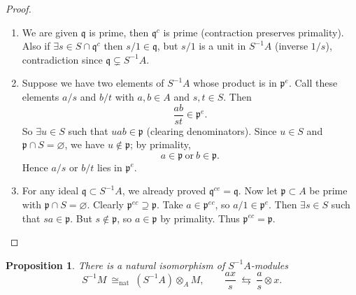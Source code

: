 \documentclass[11pt,a4paper]{article}
\theoremstyle{definition}
\theoremstyle{plain}
\newtheorem{proposition}[definition]{Proposition}
\theoremstyle{remark}
\begin{document}
\begin{proof}
    \begin{enumerate}
        \item We are given $\mathfrak{q}$ is prime, then $\mathfrak{q}^c$ is prime (contraction preserves primality).
        Also if $\exists s \in S \cap \mathfrak{q}^c$ then $s/1 \in \mathfrak{q}$, but $s/1$ is a unit in $S^{-1}A$ (inverse $1/s$), contradiction since $\mathfrak{q} \subsetneq S^{-1}A$. 

        \item Suppose we have two elements of $S^{-1}A$ whose product is in $\mathfrak{p}^e$.
        Call these elements $a/s$ and $b/t$ with $a,b\in A$ and $s,t\in S$.
        Then 
        $$\frac{ab}{st} \in \mathfrak{p}^e.$$
        So $\exists u \in S$ such that $uab \in \mathfrak{p}$ (clearing denominators).
        Since $u\in S$ and $\mathfrak{p}\cap S=\varnothing$, we have $u\notin \mathfrak{p}$; by primality,
        $$a \in \mathfrak{p} \ \text{or}\  b \in \mathfrak{p}.$$
        Hence $a/s$ or $b/t$ lies in $\mathfrak{p}^e$. 
        
        \item For any ideal $\mathfrak{q}\subset S^{-1}A$, we already proved $\mathfrak{q}^{ce}=\mathfrak{q}$.
        Now let $\mathfrak{p}\subset A$ be prime with $\mathfrak{p}\cap S=\varnothing$. Clearly $\mathfrak{p}^{ec} \supseteq \mathfrak{p}$.
        Take $a \in \mathfrak{p}^{ec}$, so $a/1 \in \mathfrak{p}^e$. Then $\exists s\in S$ such that $sa\in\mathfrak{p}$.
        But $s\notin\mathfrak{p}$, so $a\in\mathfrak{p}$ by primality. Thus $\mathfrak{p}^{ec}=\mathfrak{p}$.
    \end{enumerate}
\end{proof}

\begin{proposition}
    There is a natural isomorphism of $S^{-1}A$-modules
    \[
    S^{-1}M \ \cong_{\mathrm{nat}}\ (S^{-1}A)\otimes_A M,
    \qquad 
    \frac{ax}{s}\ \leftrightarrows\ \frac{a}{s}\otimes x.
    \]
\end{proposition}
\end{document}

